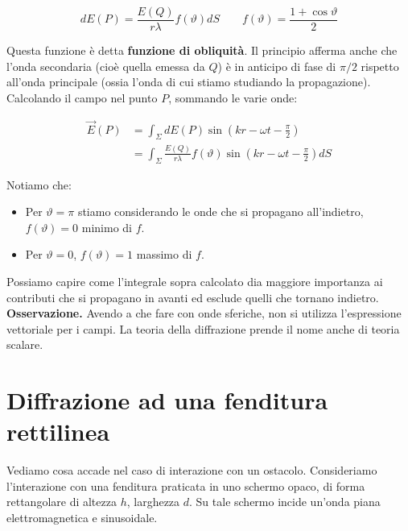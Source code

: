 \[
	dE(P)=\frac{E(Q)}{r\lambda}f(\vartheta) dS \qquad f(\vartheta)=\frac{1+\cos \vartheta}{2}
\]

Questa funzione è detta \textbf{funzione di obliquità}. Il principio afferma anche che l'onda secondaria (cioè quella emessa da $Q$) è in anticipo di fase di $\pi/2$ rispetto all'onda principale (ossia l'onda di cui stiamo studiando la propagazione). Calcolando il campo nel punto $P$, sommando le varie onde:

\begin{align*}
	\vec{E} (P)&=\int_{\Sigma}dE(P)\sin \left( kr-\omega t - \frac{\pi}{2} \right)\\
	&=\int_{\Sigma}  \frac{E(Q)}{r\lambda}f(\vartheta) \sin \left( kr-\omega t - \frac{\pi}{2} \right) dS
\end{align*}

Notiamo che:

\begin{itemize}
	\item Per $\vartheta=\pi$ stiamo considerando le onde che si propagano all'indietro, $f(\vartheta)=0$ minimo di $f$.
	\item Per $\vartheta=0$, $f(\vartheta)=1$ massimo di $f$.
\end{itemize}

Possiamo capire come l'integrale sopra calcolato dia maggiore importanza ai contributi che si propagano in avanti ed esclude quelli che tornano indietro.
\textbf{Osservazione.} Avendo a che fare con onde sferiche, non si utilizza l'espressione vettoriale per i campi. La teoria della diffrazione prende il nome anche di teoria scalare.

\section{Diffrazione ad una fenditura rettilinea}

Vediamo cosa accade nel caso di interazione con un ostacolo. Consideriamo l'interazione con una fenditura praticata in uno schermo opaco, di forma rettangolare di altezza $h$, larghezza $d$. Su tale schermo incide un'onda piana elettromagnetica e sinusoidale.

